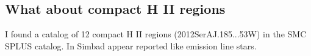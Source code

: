 \documentclass[11pt]{article}
\begin{document}




% 


\newpage
\begin{longtable}{ccc}

  
\end{longtable}

\subsection{What about compact H II regions}
\label{sec:ini}

I found a catalog of 12 compact H II regions (2012SerAJ.185...53W) in the SMC SPLUS
   catalog. In Simbad appear reported like emission line stars.
\end{document}

